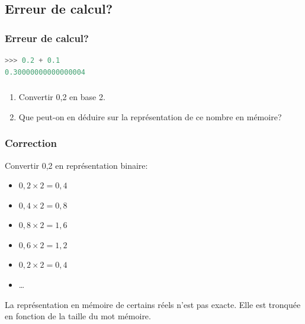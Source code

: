 \documentclass[svgnames,11pt]{beamer}
\begin{document}
\subsection{Erreur de calcul?}
\begin{frame}[fragile]
    \frametitle{Erreur de calcul?}

\begin{center}
\begin{lstlisting}[language=Python , basicstyle=\ttfamily\small, xleftmargin=2em, xrightmargin=2em]
>>> 0.2 + 0.1
0.30000000000000004
\end{lstlisting}
\label{CODE}
\end{center}

\end{frame}
\begin{frame}
    \frametitle{}

    \begin{activite}
        \begin{enumerate}
        \item Convertir 0,2 en base 2.
        \item Que peut-on en déduire sur la représentation de ce nombre en mémoire?
        \end{enumerate}
        \end{activite}

\end{frame}
\begin{frame}
    \frametitle{Correction}

    Convertir 0,2 en représentation binaire:
    \begin{itemize}
        \item $0,2×2 = 0,4$
        \item $0,4×2=0,8$
        \item $0,8×2=1,6$
        \item $0,6×2=1,2$
        \item $0,2×2 = 0,4$
        \item \dots
    \end{itemize}
\begin{aretenir}[]
La représentation en mémoire de certains réels n'est pas exacte. Elle est tronquée en fonction de la taille du mot mémoire.
\end{aretenir}
\end{frame}
\end{document}

